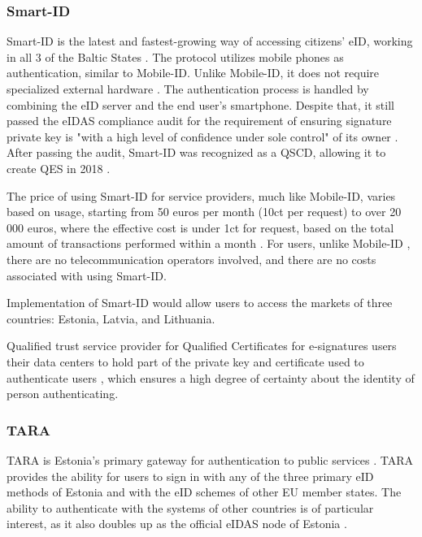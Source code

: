 
\subsubsection{Smart-ID}

Smart-ID is the latest and fastest-growing way of accessing citizens' eID, working in all 3 of the Baltic States \cite{sk-history2017}. The protocol utilizes mobile phones as authentication, similar to Mobile-ID. Unlike Mobile-ID, it does not require specialized external hardware \cite{smartid-docs}. The authentication process is handled by combining the eID server and the end user's smartphone. Despite that, it still passed the eIDAS compliance audit for the requirement of ensuring signature private key is "with a high level of confidence under sole control" of its owner \cite{enisa-eidasreq}. After passing the audit, Smart-ID was recognized as a QSCD, allowing it to create QES in 2018 \cite{smartid-qscd}.

The price of using Smart-ID for service providers, much like Mobile-ID, varies based on usage, starting from 50 euros per month (10ct per request) to over 20 000 euros, where the effective cost is under 1ct for request, based on the total amount of transactions performed within a month \cite{sk-smartidpricing}. For users, unlike Mobile-ID \cite{telia-mobileid}, there are no telecommunication operators involved, and there are no costs associated with using Smart-ID.

Implementation of Smart-ID would allow users to access the markets of three countries: Estonia, Latvia, and Lithuania.

Qualified trust service provider for Qualified Certificates for e-signatures users their data centers to hold part of the private key and certificate used to authenticate users \cite{eu-trustservices}, which ensures a high degree of certainty about the identity of person authenticating.

\subsubsection{TARA}

TARA is Estonia's primary gateway for authentication to public services \cite{tara}. TARA provides the ability for users to sign in with any of the three primary eID methods of Estonia and with the eID schemes of other EU member states. The ability to authenticate with the systems of other countries is of particular interest, as it also doubles up as the official eIDAS node of Estonia \cite{tara}.

